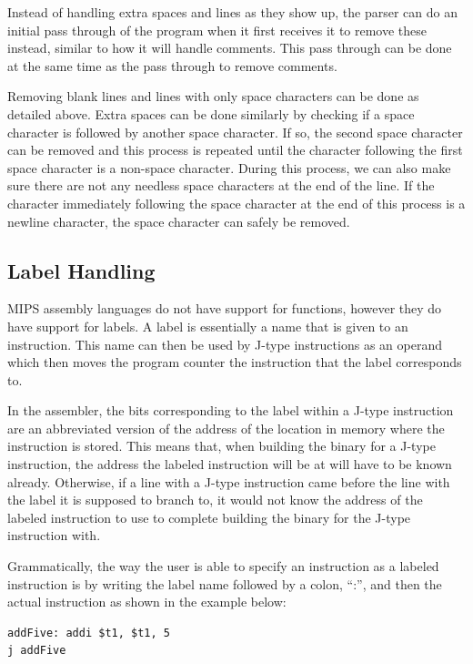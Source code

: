 \documentclass[parskip=half, fontsize=12pt]{scrartcl}
\begin{document}
Instead of handling extra spaces and lines as they show up, the parser
can do an initial pass through of the program when it first receives it
to remove these instead, similar to how it will handle comments. This
pass through can be done at the same time as the pass through to remove
comments.

Removing blank lines and lines with only space characters can be done as
detailed above. Extra spaces can be done similarly by checking if a
space character is followed by another space character. If so, the
second space character can be removed and this process is repeated until
the character following the first space character is a non-space
character. During this process, we can also make sure there are not any
needless space characters at the end of the line. If the character
immediately following the space character at the end of this process is
a newline character, the space character can safely be removed.

\subsection{Label Handling}

MIPS assembly languages do not have support for functions, however they
do have support for labels. A label is essentially a name that is given
to an instruction. This name can then be used by J-type instructions as
an operand which then moves the program counter the instruction that the
label corresponds to.

In the assembler, the bits corresponding to the label within a J-type
instruction are an abbreviated version of the address of the location in
memory where the instruction is stored. This means that, when building
the binary for a J-type instruction, the address the labeled instruction
will be at will have to be known already. Otherwise, if a line with a
J-type instruction came before the line with the label it is supposed to
branch to, it would not know the address of the labeled instruction to
use to complete building the binary for the J-type instruction with.

Grammatically, the way the user is able to specify an instruction as a
labeled instruction is by writing the label name followed by a colon,
``:'', and then the actual instruction as shown in the example below:

\begin{verbatim}
addFive: addi $t1, $t1, 5
j addFive
\end{verbatim}
\end{document}
